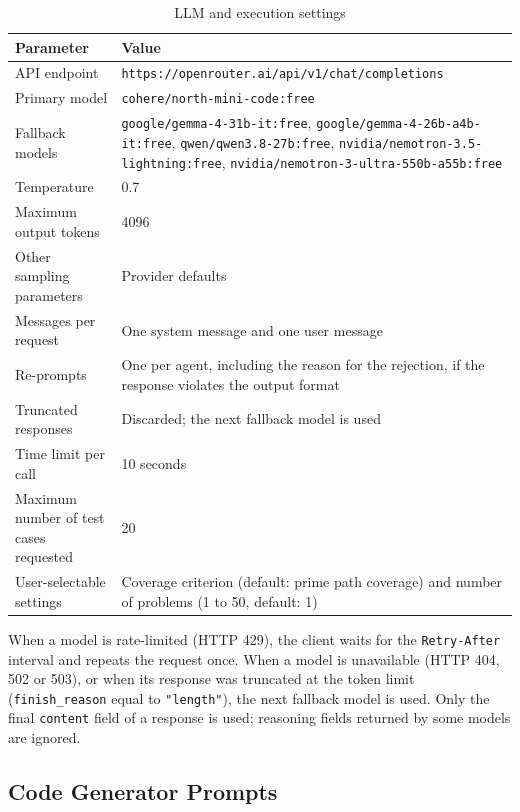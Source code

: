 \documentclass[11pt, a4paper]{article}
\newcommand{\breakpath}[1]{\nolinkurl{#1}}
\begin{document}
\begin{table}[H]
    \centering
    \small
    \begin{tabularx}{\textwidth}{>{\raggedright\arraybackslash}p{4.6cm}X}
        \toprule
        \textbf{Parameter} & \textbf{Value} \\
        \midrule
        API endpoint & \breakpath{https://openrouter.ai/api/v1/chat/completions} \\
        Primary model & \breakpath{cohere/north-mini-code:free} \\
        Fallback models & \breakpath{google/gemma-4-31b-it:free}, \breakpath{google/gemma-4-26b-a4b-it:free}, \breakpath{qwen/qwen3.8-27b:free}, \breakpath{nvidia/nemotron-3.5-lightning:free}, \breakpath{nvidia/nemotron-3-ultra-550b-a55b:free} \\
        Temperature & 0.7 \\
        Maximum output tokens & 4096 \\
        Other sampling parameters & Provider defaults \\
        Messages per request & One system message and one user message \\
        Re-prompts & One per agent, including the reason for the rejection, if the response violates the output format \\
        Truncated responses & Discarded; the next fallback model is used \\
        Time limit per call & 10 seconds \\
        Maximum number of test cases requested & 20 \\
        User-selectable settings & Coverage criterion (default: prime path coverage) and number of problems (1 to 50, default: 1) \\
        \bottomrule
    \end{tabularx}
    \caption{LLM and execution settings}
    \label{tab:settings}
\end{table}

When a model is rate-limited (HTTP 429), the client waits for the \texttt{Retry-After} interval and repeats the request once. When a model is unavailable (HTTP 404, 502 or 503), or when its response was truncated at the token limit (\texttt{finish\_reason} equal to \texttt{"length"}), the next fallback model is used. Only the final \texttt{content} field of a response is used; reasoning fields returned by some models are ignored.

\subsection{Code Generator Prompts}
\end{document}
